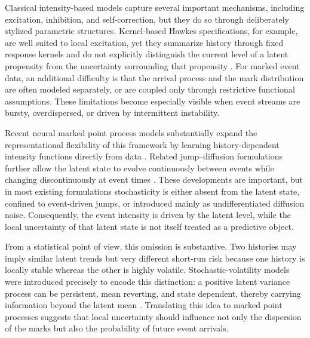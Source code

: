 \documentclass[11pt]{article}
\theoremstyle{definition}
\numberwithin{equation}{section}
\numberwithin{theorem}{section}
\numberwithin{proposition}{section}
\numberwithin{lemma}{section}
\numberwithin{corollary}{section}
\numberwithin{definition}{section}
\numberwithin{remark}{section}
\newcommand{\1}{\mathbbm{1}}
\begin{document}
Classical intensity-based models capture several important mechanisms, including excitation, inhibition, and self-correction, but they do so through deliberately stylized parametric structures. 
Kernel-based Hawkes specifications, for example, are well suited to local excitation, yet they summarize history through fixed response kernels and do not explicitly distinguish the current level of a latent propensity from the uncertainty surrounding that propensity \citep{hawkesBiometrika1971}. 
For marked event data, an additional difficulty is that the arrival process and the mark distribution are often modeled separately, or are coupled only through restrictive functional assumptions. 
These limitations become especially visible when event streams are bursty, overdispersed, or driven by intermittent instability.

Recent neural marked point process models substantially expand the representational flexibility of this framework by learning history-dependent intensity functions directly from data \citep{duRecurrentMarkedTemporal2016, Mei10.5555/3295222.3295420}. 
Related jump--diffusion formulations further allow the latent state to evolve continuously between events while changing discontinuously at event times \citep{jiaNeuralJumpStochastic2019, zhangNeuralJumpDiffusionTemporal2024}. 
These developments are important, but in most existing formulations stochasticity is either absent from the latent state, confined to event-driven jumps, or introduced mainly as undifferentiated diffusion noise. 
Consequently, the event intensity is driven by the latent level, while the local uncertainty of that latent state is not itself treated as a predictive object.

From a statistical point of view, this omission is substantive. 
Two histories may imply similar latent trends but very different short-run risk because one history is locally stable whereas the other is highly volatile. 
Stochastic-volatility models were introduced precisely to encode this distinction: a positive latent variance process can be persistent, mean reverting, and state dependent, thereby carrying information beyond the latent mean \citep{coxIngersollRoss1985, heston1993closed}. 
Translating this idea to marked point processes suggests that local uncertainty should influence not only the dispersion of the marks but also the probability of future event arrivals.
\end{document}
